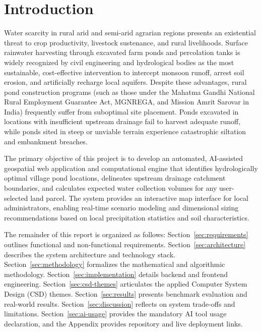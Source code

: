 \documentclass[manuscript,screen,review]{acmart}
\begin{document}
\maketitle

\section{Introduction}
\label{sec:intro}
Water scarcity in rural arid and semi-arid agrarian regions presents an existential threat to crop productivity, livestock sustenance, and rural livelihoods. Surface rainwater harvesting through excavated farm ponds and percolation tanks is widely recognized by civil engineering and hydrological bodies as the most sustainable, cost-effective intervention to intercept monsoon runoff, arrest soil erosion, and artificially recharge local aquifers. Despite these advantages, rural pond construction programs (such as those under the Mahatma Gandhi National Rural Employment Guarantee Act, MGNREGA, and Mission Amrit Sarovar in India) frequently suffer from suboptimal site placement. Ponds excavated in locations with insufficient upstream drainage fail to harvest adequate runoff, while ponds sited in steep or unviable terrain experience catastrophic siltation and embankment breaches.

The primary objective of this project is to develop an automated, AI-assisted geospatial web application and computational engine that identifies hydrologically optimal village pond locations, delineates upstream drainage catchment boundaries, and calculates expected water collection volumes for any user-selected land parcel. The system provides an interactive map interface for local administrators, enabling real-time scenario modeling and dimensional sizing recommendations based on local precipitation statistics and soil characteristics.

The remainder of this report is organized as follows: Section~\ref{sec:requirements} outlines functional and non-functional requirements. Section~\ref{sec:architecture} describes the system architecture and technology stack. Section~\ref{sec:methodology} formalizes the mathematical and algorithmic methodology. Section~\ref{sec:implementation} details backend and frontend engineering. Section~\ref{sec:csd-themes} articulates the applied Computer System Design (CSD) themes. Section~\ref{sec:results} presents benchmark evaluation and real-world results. Section~\ref{sec:discussion} reflects on system trade-offs and limitations. Section~\ref{sec:ai-usage} provides the mandatory AI tool usage declaration, and the Appendix provides repository and live deployment links.
\end{document}
